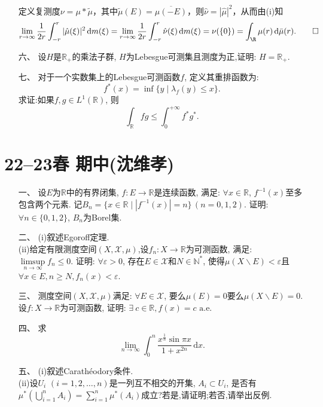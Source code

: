 \begin{itemize}
    \begin{proofc}[(ii)的提示]
        定义复测度$\nu=\mu\ast\tilde{\mu}$，其中$\tilde{\mu}(E)=\overline{\mu(-E)}$，则$\hat{\nu}=|\hat{\mu}|^2$，从而由(i)知
        \[\lim_{r\to\infty}\frac{1}{2r}\int_{-r}^{r}|\hat{\mu}(\xi)|^2\,\mathrm{d}m(\xi)
        =\lim_{r\to\infty}\frac{1}{2r}\int_{-r}^{r}\hat{\nu}(\xi)\,\mathrm{d}m(\xi)
        =\nu(\{0\})=\int_{\R}\mu({r})\,\mathrm{d}\bar{\mu}(r).\qedhere\]
    \end{proofc}
    
    \item[六、]
    设$H$是$\mathbb{R}_+$的乘法子群, $H$为Lebesgue可测集且测度为正,证明: $H=\mathbb{R}_+$.
    
    \item[七、]
    对于一个实数集上的Lebesgue可测函数$f$, 定义其重排函数为:
    $$f^*(x) = \inf \{y\mid\lambda_f(y) \leq x\}.$$
    求证:如果$f,g\in  L^1(\mathbb{R})$, 则
    \[\int_{\mathbb{R}} fg \leq \int_0^{+\infty} f^* g^*.\]
\end{itemize}



\section{22--23春 期中(沈维孝)}

\begin{itemize}
    \item[一、]
    设$E$为$\mathbb{R}$中的有界闭集, $f:E\to \mathbb{R}$是连续函数,
    满足: $\forall x\in\mathbb{R}$, $f^{-1}(x)$至多包含两个元素.
    记$B_n=\{x\in\mathbb{R}\mid |f^{-1}(x)|=n\}\,(n=0,1,2)$.
    证明: $\forall n\in \{0,1,2\}$, $B_n$为Borel集.
    \item[二、]
    (i)叙述Egoroff定理.\\
    (ii)给定有限测度空间$(X,\mathcal{X},\mu)$,设$f_n:X\to\mathbb{R}$为可测函数,
    满足: $\limsup\limits_{n\to\infty} f_n\le 0$.
    证明: $\forall \varepsilon >0$, 存在$E\in\mathcal{X}$和$N\in\mathbb{N}^*$,
    使得$\mu(X\backslash E)<\varepsilon$且
    $\forall x\in E, n\ge N,f_n(x)<\varepsilon.$
    \item[三、]
    测度空间$(X,\mathcal{X},\mu)$满足: $\forall E\in \mathcal{X}$,
    要么$\mu(E)=0$要么$\mu(X\backslash E)=0.$设$f:X\to\mathbb{R}$为可测函数,
    证明: $\exists\: c\in\mathbb{R},f(x)=c \text{ a.e.}$
    \item[四、]
    求
    $$ \lim_{n\to\infty} \int_0^n \frac{x^\frac{1}{n} \sin \pi x}{1+x^{2n}} \,\mathrm{d} x.$$
    \item[五、]
    (i)叙述Carathéodory条件.\\
    (ii)设$U_i$ $(i=1,2,\ldots,n)$是一列互不相交的开集, $A_i \subset U_i$,
    是否有$\mu^*(\bigcup\limits_{i=1}^n A_i)
    =\sum\limits_{i=1}^n \mu^*(A_i)$成立?若是,请证明;若否,请举出反例.
\end{itemize}

